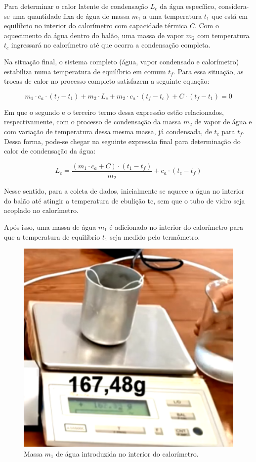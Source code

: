 Para determinar o calor latente de condensação $L_c$ da água específico, considera-se uma quantidade fixa de água de massa $m_1$ a uma temperatura $t_1$ que está em equilíbrio no interior do calorímetro com capacidade térmica $C$. Com o aquecimento da água dentro do balão, uma massa de vapor $m_2$ com temperatura $t_c$ ingressará no calorímetro até que ocorra a condensação completa.

Na situação final, o sistema completo (água, vapor condensado e calorímetro) estabiliza numa temperatura de equilíbrio em comum $t_f$. Para essa situação, as trocas de calor no processo completo satisfazem a seguinte equação:

\[ m_1 \cdot c_a \cdot (t_f - t_1) + m_2 \cdot L_c + m_2 \cdot c_a \cdot (t_f - t_c) + C \cdot (t_f - t_1) = 0\]

Em que o segundo e o terceiro termo dessa expressão estão relacionados, respectivamente, com o processo de condensação da massa $m_2$ de vapor de água e com variação de temperatura dessa mesma massa, já condensada, de $t_c$ para $t_f$. Dessa forma, pode-se chegar na seguinte expressão final para determinação do calor de condensação da água:

\[ L_c = \frac{(m_1 \cdot c_a + C) \cdot (t_1 - t_f)}{m_2} + c_a \cdot (t_c - t_f)\]

Nesse sentido, para a coleta de dados, inicialmente se aquece a água no interior do balão até atingir a temperatura de ebulição tc, sem que o tubo de vidro seja acoplado no calorímetro.

Após isso, uma massa de água $m_1$ é adicionado no interior do calorímetro para que a temperatura de equilíbrio $t_1$ seja medido pelo termômetro.

\begin{figure}[H]
  \centering
  \includegraphics[scale=0.6]{images/Massa m1.png}
  \caption{Massa $m_1$ de água introduzida no interior do calorímetro.}
\end{figure}

